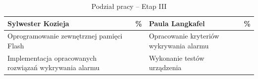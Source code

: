 \documentclass[10pt, a4paper]{article}
\begin{document}
\begin{table}[H]
	\centering
	\begin{tabular}{|L{7cm}|L{0.8cm}||L{7cm}|L{0.8cm}|}
		\hline
		\hline
		\textbf{Sylwester Kozieja} & 
		\% & 
		\textbf{Paula Langkafel} & \%\\
		\hline
		\hline
		Oprogramowanie zewnętrznej pamięci Flash		& &	
		Opracowanie kryteriów wykrywania alarmu &\\
		\hline
		Implementacja opracowanych rozwiązań wykrywania alarmu  & &
		Wykonanie testów urządzenia &\\
		\hline
	\end{tabular}
	\caption{Podział pracy -- Etap III}
	\label{tab:PodzialPracyEtap3}
\end{table}


\newpage


\nocite{*}


\end{document}
